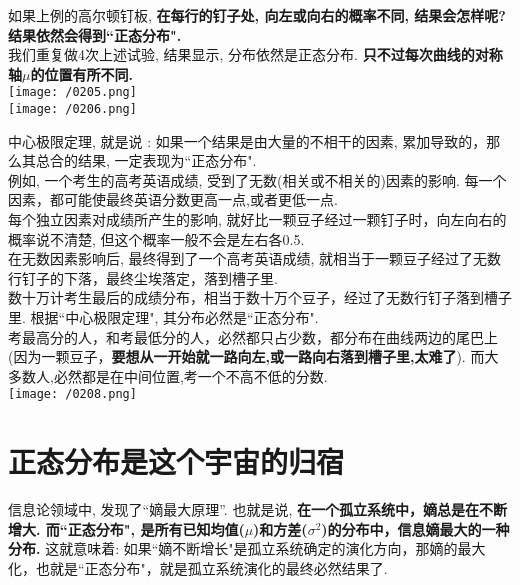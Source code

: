 \documentclass[UTF8]{ctexart}
\begin{document}
	
	
	
	
	\begin{myEnvSample}
		如果上例的高尔顿钉板, \textbf{在每行的钉子处, 向左或向右的概率不同, 结果会怎样呢? 结果依然会得到``正态分布".}   \\
		我们重复做4次上述试验, 结果显示, 分布依然是正态分布. \textbf{只不过每次曲线的对称轴$\mu$的位置有所不同.} \\
		
		\texttt{[image: /0205.png]} 	\\
		
		\texttt{[image: /0206.png]} 
	\end{myEnvSample}


	中心极限定理, 就是说 : 如果一个结果是由大量的不相干的因素, 累加导致的，那么其总合的结果, 一定表现为``正态分布". \\
	
	例如, 一个考生的高考英语成绩, 受到了无数(相关或不相关的)因素的影响. 每一个因素，都可能使最终英语分数更高一点,或者更低一点. \\
	每个独立因素对成绩所产生的影响, 就好比一颗豆子经过一颗钉子时，向左向右的概率说不清楚, 但这个概率一般不会是左右各0.5. \\	
	在无数因素影响后, 最终得到了一个高考英语成绩, 就相当于一颗豆子经过了无数行钉子的下落，最终尘埃落定，落到槽子里. \\
	
	数十万计考生最后的成绩分布，相当于数十万个豆子，经过了无数行钉子落到槽子里. 根据``中心极限定理", 其分布必然是``正态分布". \\
	考最高分的人，和考最低分的人，必然都只占少数，都分布在曲线两边的尾巴上(因为一颗豆子，\textbf{要想从一开始就一路向左,或一路向右落到槽子里,太难了}). 而大多数人,必然都是在中间位置,考一个不高不低的分数. \\
	
	
	\texttt{[image: /0208.png]} 
	
	
	
	\section{正态分布是这个宇宙的归宿}
	
	信息论领域中, 发现了``嫡最大原理”. 也就是说, \textbf{在一个孤立系统中，嫡总是在不断增大. 而``正态分布", 是所有已知均值($\mu$)和方差($\sigma^2$)的分布中，信息嫡最大的一种分布.} 这就意味着: 如果``嫡不断增长"是孤立系统确定的演化方向，那嫡的最大化，也就是``正态分布"，就是孤立系统演化的最终必然结果了.
	
\end{document}

